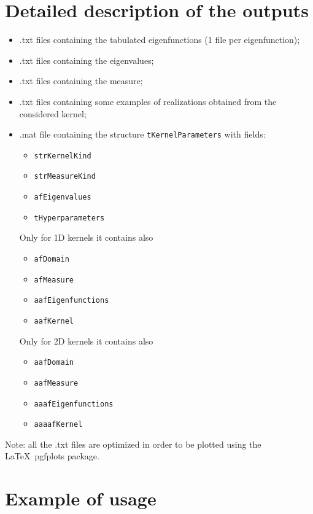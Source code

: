 \documentclass[a4paper, 10pt, twoside]{article} %
\begin{document}
\section{Detailed description of the outputs}
\label{sec:outputs}

\begin{itemize}
	\item .txt files containing the tabulated eigenfunctions (1 file per eigenfunction);
	\item .txt files containing the eigenvalues;
	\item .txt files containing the measure;
	\item .txt files containing some examples of realizations obtained from the considered kernel;
	\item .mat file containing the structure \texttt{tKernelParameters} with fields:
		\begin{itemize}
			\item \texttt{strKernelKind}
			\item \texttt{strMeasureKind}
			\item \texttt{afEigenvalues}
			\item \texttt{tHyperparameters}
		\end{itemize}
		Only for 1D kernels it contains also
		\begin{itemize}
			\item \texttt{afDomain}
			\item \texttt{afMeasure}
			\item \texttt{aafEigenfunctions}
			\item \texttt{aafKernel}
		\end{itemize}
		Only for 2D kernels it contains also
		\begin{itemize}
			\item \texttt{aafDomain}
			\item \texttt{aafMeasure}
			\item \texttt{aaafEigenfunctions}
			\item \texttt{aaaafKernel}
		\end{itemize}
\end{itemize}

Note: all the .txt files are optimized in order to be plotted using the \LaTeX\ pgfplots package.

\section{Example of usage}
\label{sec:example_of_usage}
\end{document}
